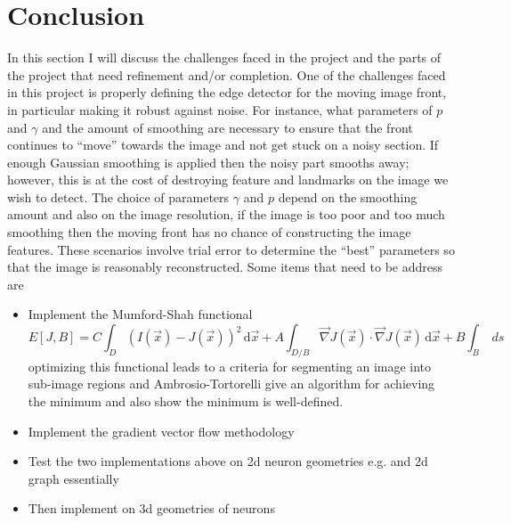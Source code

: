 \documentclass[margin=1in,12pt,3p]{elsarticle}
\begin{document}
\section{Conclusion}
In this section I will discuss the challenges faced in the project and the parts of the project that need refinement and/or completion. One of the challenges faced in this project is properly defining the edge detector for the moving image front, in particular making it robust against noise. For instance, what parameters of $p$ and $\gamma$ and the amount of smoothing are necessary to ensure that the front continues to ``move'' towards the image and not get stuck on a noisy section. If enough Gaussian smoothing is applied then the noisy part smooths away; however, this is at the cost of destroying feature and landmarks on the image we wish to detect. The choice of parameters  $\gamma$ and $p$ depend on the smoothing amount and also on the image resolution, if the image is too poor and too much smoothing then the moving front has no chance of constructing the image features. These scenarios involve trial error to determine the ``best'' parameters so that the image is reasonably reconstructed. Some items that need to be address are
\begin{itemize}
    \item Implement the Mumford-Shah functional \cite{doi:10.1002/cpa.3160430805}
\[
{\displaystyle E[J,B]=C\int _{D}(I({\vec {x}})-J({\vec {x}}))^{2}\,\mathrm {d} {\vec {x}}+A\int _{D/B}{\vec {\nabla }}J({\vec {x}})\cdot {\vec {\nabla }}J({\vec {x}})\,\mathrm {d} {\vec {x}}+B\int _{B}\ ds}
\]
optimizing this functional leads to a criteria for segmenting an image into sub-image regions and Ambrosio-Tortorelli give an algorithm for achieving the minimum and also show the minimum is well-defined.
\item Implement the gradient vector flow methodology
    \item Test the two implementations above on 2d neuron geometries e.g. and 2d graph essentially
    \item Then implement on 3d geometries of neurons
\end{itemize}

\nocite{*} 

\end{document}
